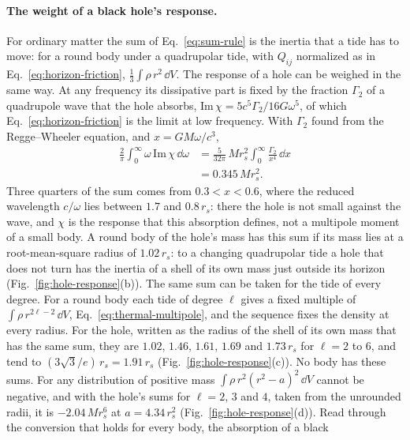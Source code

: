 \paragraph{The weight of a black hole's response.} For ordinary matter the sum
of Eq.~\eqref{eq:sum-rule} is the inertia that a tide has to move: for a round
body under a quadrupolar tide, with $Q_{ij}$ normalized as in
Eq.~\eqref{eq:horizon-friction}, $\tfrac13\int\rho\,r^2\,\dd V$. The response of
a hole can be weighed in the same way. At any frequency its dissipative part
is fixed by the fraction $\Gamma_2$ of a quadrupole wave that the hole
absorbs, $\mathrm{Im}\,\chi = 5c^5\Gamma_2/16G\omega^5$, of which
Eq.~\eqref{eq:horizon-friction} is the limit at low frequency. With $\Gamma_2$
found from the Regge--Wheeler equation, and $x = GM\omega/c^3$,
\begin{equation}\label{eq:hole-sum-rule}
\begin{aligned}
\frac{2}{\pi}\int_0^\infty\omega\,\mathrm{Im}\,\chi\,\dd\omega
&= \frac{5}{32\pi}\,Mr_s^2\int_0^\infty\frac{\Gamma_2}{x^4}\,\dd x\\
&= 0.345\,Mr_s^2 .
\end{aligned}
\end{equation}
Three quarters of the sum comes from $0.3 < x < 0.6$, where the reduced
wavelength $c/\omega$ lies between $1.7$ and $0.8\,r_s$: there the hole is not
small against the wave, and $\chi$ is the response that this absorption
defines, not a multipole moment of a small body.
A round body of the hole's mass has this sum if its mass lies at a
root-mean-square radius of $1.02\,r_s$: to a changing quadrupolar tide a hole that does
not turn has the inertia of a shell of its own mass just outside its horizon
(Fig.~\ref{fig:hole-response}(b)).
The same sum can be taken for the tide of every degree. For a round body each
tide of degree $\ell$ gives a fixed multiple of $\int\rho\,r^{2\ell-2}\,\dd V$,
Eq.~\eqref{eq:thermal-multipole}, and the sequence fixes the density at every
radius. For the hole, written as the radius of the shell of its own mass that
has the same sum, they are $1.02$, $1.46$, $1.61$, $1.69$ and $1.73\,r_s$ for
$\ell = 2$ to $6$, and tend to $(3\sqrt3/e)\,r_s = 1.91\,r_s$ (Fig.~\ref{fig:hole-response}(c)). No body has
these sums. For any distribution of positive mass
$\int\rho\,r^2(r^2 - a)^2\,\dd V$ cannot be negative, and with the hole's sums
for $\ell = 2$, $3$ and $4$, taken from the unrounded radii, it is $-2.04\,Mr_s^6$ at $a = 4.34\,r_s^2$ (Fig.~\ref{fig:hole-response}(d)). Read
through the conversion that holds for every body, the absorption of a black
